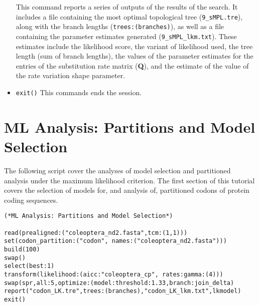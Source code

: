\begin{itemize}
This command reports a series of outputs of the results of the
search.  It includes a file containing the most optimal topological
tree (\texttt{9\_sMPL.tre}), along with the branch lengths
(\texttt{trees:(branches)}), as well as a file containing the
parameter estimates generated (\texttt{9\_sMPL\_lkm.txt}). These
estimates include the likelihood score, the variant of likelihood
used, the tree length (sum of branch lengths), the values of the
parameter estimates for the entries of the substitution rate matrix
(\textbf{Q}), and the estimate of the value of the rate variation
shape parameter.  
\item \texttt{exit()}  This commands ends the \poy session.

\end{itemize}


\section{ML Analysis: Partitions and Model Selection}{\label{tutorial16}}

The following script cover the analyses of model selection and partitioned analysis under 
the maximum likelihood criterion. The first section of this tutorial covers the selection 
of models for, and analysis of, partitioned codons of protein coding sequences. 

\begin{verbatim}
(*ML Analysis: Partitions and Model Selection*) 

read(prealigned:("coleoptera_nd2.fasta",tcm:(1,1)))
set(codon_partition:("codon", names:("coleoptera_nd2.fasta")))
build(100)
swap()
select(best:1)
transform(likelihood:(aicc:"coleoptera_cp", rates:gamma:(4)))
swap(spr,all:5,optimize:(model:threshold:1.33,branch:join_delta)
report("codon_LK.tre",trees:(branches),"codon_LK_lkm.txt",lkmodel)
exit()
\end{verbatim}

